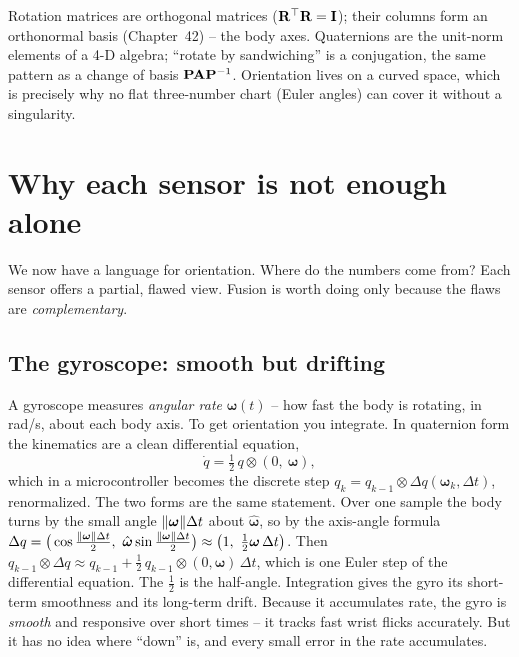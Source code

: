 \begin{connectionbox}
Rotation matrices are orthogonal
matrices ($\mathbf{R}^\top\mathbf{R}=\mathbf{I}$); their
columns form an orthonormal basis (Chapter~42) -- the body axes. Quaternions are the unit-norm
elements of a 4-D algebra; ``rotate by sandwiching'' is a conjugation, the same pattern
as a change of basis $\mathbf{P} \mathbf{A} \mathbf{P}^{-1}$. Orientation lives on a curved space,
which is precisely why no flat three-number chart (Euler angles) can cover it
without a singularity.
\end{connectionbox}

\section{Why each sensor is not enough alone}
\label{ch36:why-not-enough}

We now have a language for orientation. Where do the numbers come from? Each sensor
offers a partial, flawed view. Fusion is worth doing only because the flaws are
\emph{complementary}.

\subsection{The gyroscope: smooth but drifting}
\label{ch36:gyro-drift}

A gyroscope measures \emph{angular rate} $\boldsymbol\omega(t)$ -- how fast the body is
rotating, in rad/s, about each body axis. To get orientation you integrate. In
quaternion form the kinematics are a clean differential equation,
\[
  \dot q = \tfrac{1}{2}\, q \otimes (0,\ \boldsymbol\omega),
\]
which in a microcontroller becomes the discrete step $q_{k} = q_{k-1} \otimes
\Delta q(\boldsymbol\omega_k,\Delta t)$, renormalized. The two forms are the same
statement. Over one sample the body turns by the small angle $\lVert\boldsymbol\omega\rVert\Delta t$
about $\hat{\boldsymbol\omega}$, so by the axis-angle formula
$\Delta q = \big(\cos\tfrac{\norm{\boldsymbol\omega}\Delta t}{2},\ \hat{\boldsymbol\omega}\sin\tfrac{\norm{\boldsymbol\omega}\Delta t}{2}\big)
\approx \big(1,\ \tfrac12\boldsymbol\omega\,\Delta t\big)$. Then
$q_{k-1}\otimes\Delta q \approx q_{k-1} + \tfrac12\,q_{k-1}\otimes(0,\boldsymbol\omega)\,\Delta t$,
which is one Euler step of the differential equation. The $\tfrac12$ is the half-angle. Integration gives the gyro its
short-term smoothness and its long-term drift. Because it accumulates rate, the gyro is \emph{smooth} and
responsive over short times -- it tracks fast wrist flicks accurately. But it has no
idea where ``down'' is, and every small error in the rate accumulates.

